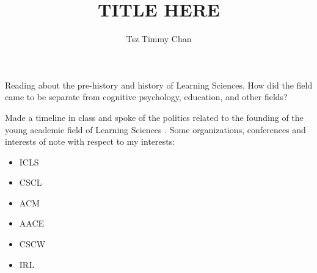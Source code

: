 \documentclass{TC}
\title{TITLE HERE}	%
\author{Tsz Timmy Chan}	%
\begin{document}
Reading about the pre-history and history of Learning Sciences. How did the field came to be separate from cognitive psychology, education, and other fields?

Made a timeline in class and spoke of the politics related to the founding of the young academic field of Learning Sciences \parencite{pea_prehistory_2016, kolodner_forward_2018, hoadley_short_2018}.
Some organizations, conferences and interests of note with respect to my interests:

\begin{itemize}
\item \gls{ICLS}
\item \gls{CSCL}
\item \gls{ACM}
\item \gls{AACE}
\item \gls{CSCW}
\item \gls{IRL}

\end{itemize}
\end{document}
